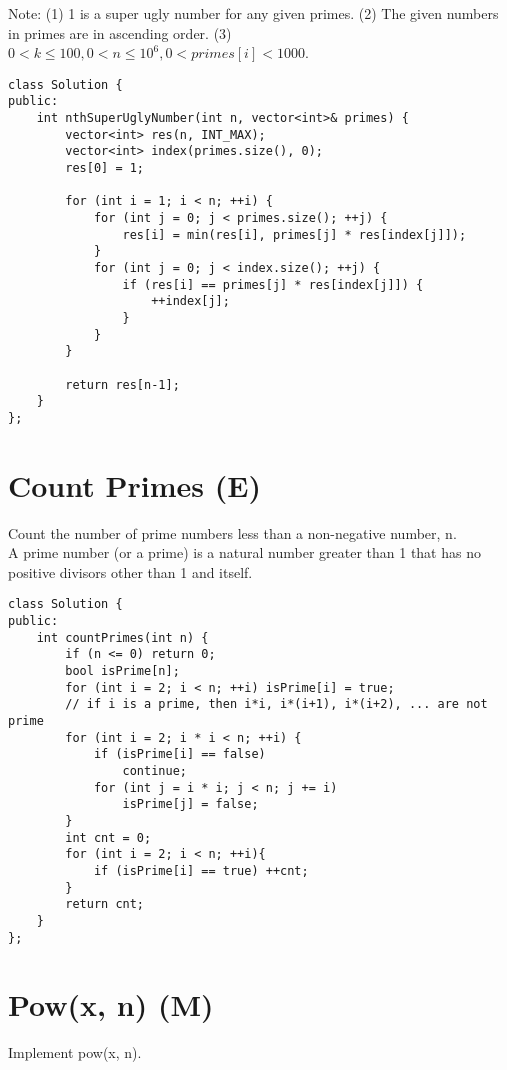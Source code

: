 Note:
(1) 1 is a super ugly number for any given primes.
(2) The given numbers in primes are in ascending order.
(3) $0 < k \leq 100, 0 < n \leq 10^6, 0 < primes[i] < 1000$. \\

\begin{lstlisting}
class Solution {
public:
    int nthSuperUglyNumber(int n, vector<int>& primes) {
        vector<int> res(n, INT_MAX);
        vector<int> index(primes.size(), 0);
        res[0] = 1;
        
        for (int i = 1; i < n; ++i) {
            for (int j = 0; j < primes.size(); ++j) {
                res[i] = min(res[i], primes[j] * res[index[j]]);
            }
            for (int j = 0; j < index.size(); ++j) {
                if (res[i] == primes[j] * res[index[j]]) {
                    ++index[j];
                }
            }
        }
        
        return res[n-1];
    }
};
\end{lstlisting}


\section{Count Primes (E)}
Count the number of prime numbers less than a non-negative number, n. \\
A prime number (or a prime) is a natural number greater than 1 that has no positive divisors other than 1 and itself. \\

\begin{lstlisting}
class Solution {
public:
    int countPrimes(int n) {
        if (n <= 0) return 0;
        bool isPrime[n];
        for (int i = 2; i < n; ++i) isPrime[i] = true;
        // if i is a prime, then i*i, i*(i+1), i*(i+2), ... are not prime
        for (int i = 2; i * i < n; ++i) {
            if (isPrime[i] == false)    
                continue;
            for (int j = i * i; j < n; j += i)  
                isPrime[j] = false;
        }
        int cnt = 0;
        for (int i = 2; i < n; ++i){
            if (isPrime[i] == true) ++cnt;
        }
        return cnt;
    }
};
\end{lstlisting}


\section{Pow(x, n) (M)}
Implement pow(x, n). \\

